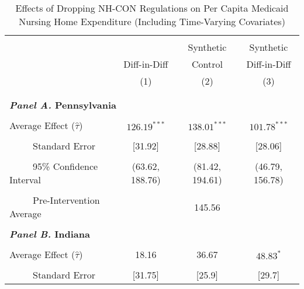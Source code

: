 \documentclass[12pt]{article}
\begin{document}
\null
\vfill
\begin{table}[htbp]\centering \footnotesize
\def\sym#1{\ifmmode^{#1}\else\(^{#1}\)\fi}
\captionsetup{width=.8\textwidth}
\caption{\centering Effects of Dropping NH-CON Regulations on Per Capita Medicaid Nursing Home Expenditure (Including Time-Varying Covariates)}
\label{tab:ave_results_med_exp_nobord_con}
\setlength{\tabcolsep}{10pt}
\begin{tabular}{l*{3}{c}}
\hline\hline
\\[-2ex]
&\multicolumn{1}{c}{}&\multicolumn{1}{c}{Synthetic}&\multicolumn{1}{c}{Synthetic}\\
&\multicolumn{1}{c}{Diff-in-Diff}&\multicolumn{1}{c}{Control}&\multicolumn{1}{c}{Diff-in-Diff}\\
&\multicolumn{1}{c}{(1)}&\multicolumn{1}{c}{(2)}&\multicolumn{1}{c}{(3)}\\
\\[-2ex]
\hline
\\[-.1ex]
\multicolumn{4}{l}{\textbf{\textit{Panel A.} Pennsylvania}}\\
\\[-1.5ex]
\multicolumn{1}{l}{Average Effect ($\hat{\tau}$)}&   \multicolumn{1}{c}{$126.19^{***}$}&   \multicolumn{1}{c}{$138.01^{***}$}&  \multicolumn{1}{c}{$101.78^{***}$}\\
\\[-2ex]
\multicolumn{1}{l}{\ \ \ \ \ Standard Error}  &\multicolumn{1}{c}{[31.92]}&\multicolumn{1}{c}{[28.88]}&\multicolumn{1}{c}{[28.06]}\\
\\[-2ex]
\multicolumn{1}{l}{\ \ \ \ \ 95\% Confidence Interval}&   \multicolumn{1}{c}{(63.62, 188.76)}&   \multicolumn{1}{c}{(81.42, 194.61)}&   \multicolumn{1}{c}{(46.79, 156.78)}\\
\\[-2ex]
\multicolumn{1}{l}{\ \ \ \ \ Pre-Intervention Average}&   \multicolumn{3}{c}{145.56}\\
\\[-.1ex]
\multicolumn{4}{l}{\textbf{\textit{Panel B.} Indiana}}\\
\\[-1.5ex]
\multicolumn{1}{l}{Average Effect ($\hat{\tau}$)}&   \multicolumn{1}{c}{18.16}&   \multicolumn{1}{c}{36.67}&  \multicolumn{1}{c}{$48.83^{*}$}\\
\\[-2ex]
\multicolumn{1}{l}{\ \ \ \ \ Standard Error}  &\multicolumn{1}{c}{[31.75]}&\multicolumn{1}{c}{[25.9]}&\multicolumn{1}{c}{[29.7]}\\

\end{tabular}
\end{table}
\end{document}
